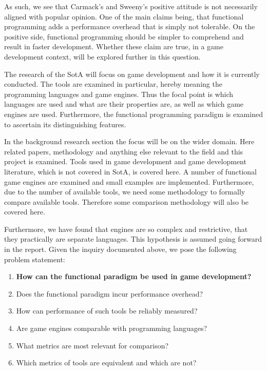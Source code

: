 As such, we see that Carmack's and Sweeny's positive attitude is not necessarily aligned with popular opinion. One of the main claims being, that functional programming adds a performance overhead that is simply not tolerable. On the positive side, functional programming should be simpler to comprehend and result in faster development. Whether these claim are true, in a game development context, will be explored further in this question.

The research of the \ac{SotA} will focus on game development and how it is currently conducted. The tools are examined in particular, hereby meaning the programming languages and game engines. Thus the focal point is which languages are used and what are their properties are, as well as which game engines are used. Furthermore, the functional programming paradigm is examined to ascertain its distinguishing features.

In the background research section the focus will be on the wider domain. Here related papers, methodology and anything else relevant to the field and this project is examined. Tools used in game development and game development literature, which is not covered in \ac{SotA}, is covered here. A number of functional game engines are examined and small examples are implemented. Furthermore, due to the number of available tools, we need some methodology to formally compare available tools. Therefore some comparison methodology will also be covered here.

Furthermore, we have found that engines are so complex and restrictive, that they practically are separate languages. This hypothesis is assumed going forward in the report. Given the inquiry documented above, we pose the following problem statement:

\begin{center}
    \begin{enumerate}
        \item \textbf{How can the functional paradigm be used in game development?}
        \item Does the functional paradigm incur performance overhead?
        \item How can performance of such tools be reliably measured?
        \item Are game engines comparable with programming languages?
        \item What metrics are most relevant for comparison?
        \item Which metrics of tools are equivalent and which are not?
    \end{enumerate}
\end{center}